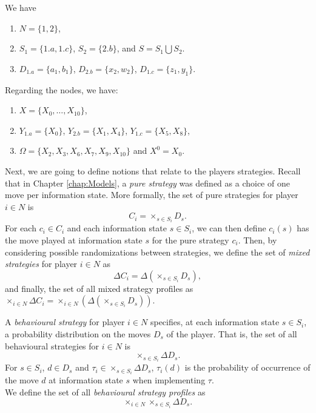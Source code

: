 \begin{example}
We have
\begin{enumerate}
\item  $N = \{1,2\}$,
\item $S_1 = \{1.a, 1.c\}$, $S_2 = \{2.b\}$, and $S = S_1 \bigcup S_2$.
\item $D_{1.a} = \{a_1,b_1\}$, $D_{2.b} = \{x_2,w_2\}$, $D_{1.c} = \{z_1, y_1\}$.
\end{enumerate}
Regarding the nodes, we have:
\begin{enumerate}[resume]
\item $X = \{X_0, \ldots, X_{10}\}$,
\item $Y_{1.a} = \{X_0\}$, $Y_{2.b} = \{X_1, X_4\} $, $Y_{1.c} = \{X_5, X_8\}$,
\item $\Omega = \{X_2, X_3, X_6, X_7, X_9, X_{10}\}$ and $X^0 = X_0$.
\end{enumerate}
\label{ch4:ex:Formalism}
\end{example}

Next, we are going to define notions that relate to the players strategies.
Recall that in Chapter \ref{chap:Models}, a \emph{pure strategy} was defined as a choice of one move per information state. More formally, the set of pure strategies for player $i \in N$ is
$$ C_i = \times_{s \in S_i} D_s.$$
For each $c_i \in C_i$ and each information state $s \in S_i$, we can then define $c_i(s)$ has the move played at information state $s$ for the pure strategy $c_i$.
Then, by considering possible randomizations between strategies, we define the set of \emph{mixed strategies} for player $i \in N$ as
\begin{equation}
\Delta C_i = \Delta\left ( \times_{s \in S_i} D_s \right ),
\label{ch4:eq:mixedStrat}
\end{equation}
and finally, the set of all mixed strategy profiles as $\times_{i \in N} \Delta C_i = \times_{i \in N}  \left( \Delta\left ( \times_{s \in S_i} D_s \right ) \right )$.

\begin{definition}
A \emph{behavioural strategy} for player $i \in N$ specifies, at each information state $s \in S_i$, a probability distribution on the moves $D_s$ of the player. That is, the set of all behavioural strategies for $i \in N$ is
\begin{equation}
\times_{s \in S_i}  \Delta D_s.
\label{ch4:eq:behav}
\end{equation}
For $s \in S_i$, $d \in D_s$ and $\tau_i \in \times_{s \in S_i}  \Delta D_s$, $\tau_i(d)$ is the probability of occurrence of the move $d$ at information state $s$ when implementing $\tau$. \\
We define the set of all \emph{behavioural strategy profiles} as
$$ \times_{i \in N} \times_{s \in S_i} \Delta D_s.$$
\end{definition}

